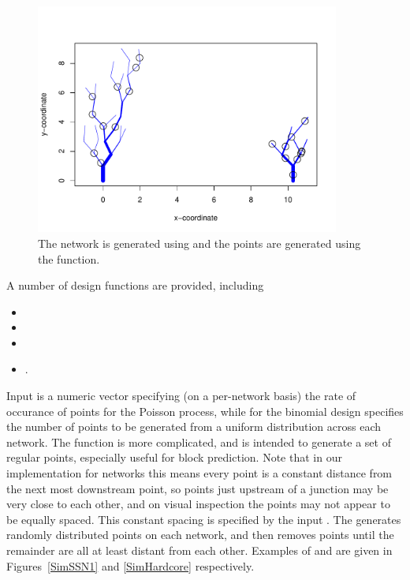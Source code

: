 \documentclass[nojss]{jss}
\begin{document}
\begin{figure}[htbp]
  \begin{center}
    \includegraphics[keepaspectratio=true, width = 100mm]{Figures/jss984Fig-SimIterative}
    \caption{The network is generated using 
      and the points are generated using the 
      function. \label{SimIterative}}
  \end{center}
\end{figure}

A number of design functions are provided, including
\begin{itemize}
\item {}
\item {}
\item {}
\item {}.
\end{itemize}
Input  is a numeric vector specifying (on a per-network
basis) the rate of occurance of points for the Poisson process, while
for the binomial design  specifies the number of points to be
generated from a uniform distribution across each network. The
 function is more complicated, and is intended
to generate a set of regular points, especially useful for block
prediction.  Note that in our implementation for networks this means
every point is a constant distance from the next most downstream
point, so points just upstream of a junction may be very close to each
other, and on visual inspection the points may not appear to be
equally spaced.  This constant spacing is specified by the input
.  The  generates
 randomly distributed points on each network, and then removes
points until the remainder are all at least 
distant from each other.  Examples of  and
 are given in Figures~\ref{SimSSN1} and
\ref{SimHardcore} respectively.
\end{document}

